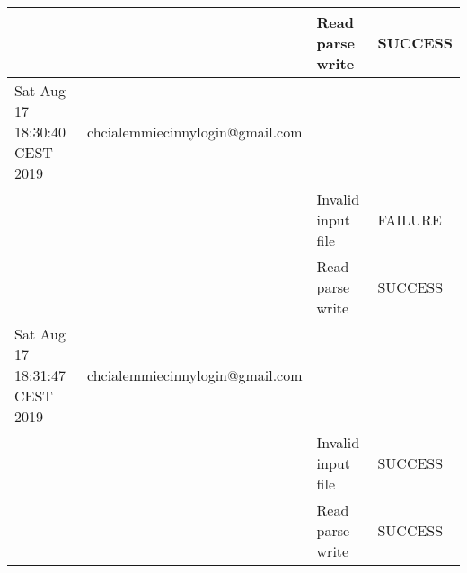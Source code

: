 \begin{table}[]
{\begin{tabular}{|l|l|l|l|}
    &                                            & Read parse write                            & SUCCESS                                \\ \hline
    Sat Aug 17 18:30:40 CEST 2019        & chcialemmiecinnylogin@gmail.com            &                                             &                                        \\ \hline
    &                                            & Invalid input file                          & FAILURE                                \\ \hline
    &                                            & Read parse write                            & SUCCESS                                \\ \hline
    Sat Aug 17 18:31:47 CEST 2019        & chcialemmiecinnylogin@gmail.com            &                                             &                                        \\ \hline
    &                                            & Invalid input file                          & SUCCESS                                \\ \hline
    &                                            & Read parse write                            & SUCCESS                                \\ \hline
\end{tabular}
\label{tab:read_parse_write}

}
\end{table}